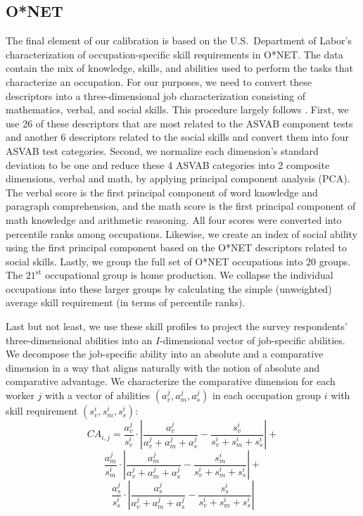 \documentclass[onehalfspacing,11pt]{article}
\begin{document}
	\subsection{O*NET}
	The final element of our calibration is based on the U.S.~Department of Labor’s characterization of occupation-specific skill requirements in O*NET. The data contain the mix of knowledge, skills, and abilities used to perform the tasks that characterize an occupation. For our purposes, we need to convert these descriptors into a three-dimensional job characterization consisting of mathematics, verbal, and social skills. This procedure largely follows \cite{Guvenen:2020}. First, we use 26 of these descriptors that are most related to the ASVAB component tests and another 6 descriptors related to the social skills and convert them into four ASVAB test categories. Second, we normalize each dimension’s standard deviation to be one and reduce these 4 ASVAB categories into 2 composite dimensions, verbal and math, by applying principal component analysis (PCA). The verbal score is the first principal component of word knowledge and paragraph comprehension, and the math score is the first principal component of math knowledge and arithmetic reasoning. All four scores were converted into percentile ranks among occupations. Likewise, we create an index of social ability using the first principal component based on the O*NET descriptors related to social skills. Lastly, we group the full set of O*NET occupations into 20 groups. The $21^{\textrm{st}}$ occupational group is home production. We collapse the individual occupations into these larger groups by calculating the simple (unweighted) average skill requirement (in terms of percentile ranks).
	
	Last but not least, we use these skill profiles to project the survey respondents' three-dimensional abilities into an $I$-dimensional vector of job-specific abilities. We decompose the job-specific ability into an absolute and a comparative dimension in a way that aligns naturally with the notion of absolute and comparative advantage. We characterize the comparative dimension for each worker $j$ with a vector of abilities $(a^j_v, a^j_m, a^j_s)$ in each occupation group $i$ with skill requirement $(s^i_v, s^i_m, s^i_s)$:
	\[CA_{i,j}=\frac{a^j_v}{s^i_v} \cdot \left|\frac{a^j_v}{a^j_v+a^j_m+a^j_s}-\frac{s^i_v}{s^i_v+s^i_m+s^i_s}\right|+\]
	\[\frac{a^j_m}{s^i_m} \cdot \left|\frac{a^j_m}{a^j_v+a^j_m+a^j_s}-\frac{s^i_m}{s^i_v+s^i_m+s^i_s}\right|+\]
	\[\frac{a^j_s}{s^i_s} \cdot \left|\frac{a^j_s}{a^j_v+a^j_m+a^j_s}-\frac{s^i_s}{s^i_v+s^i_m+s^i_s}\right|\]
	
\end{document}
